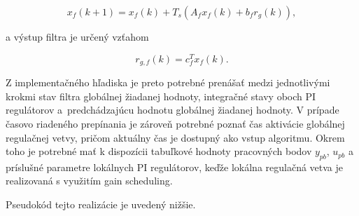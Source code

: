 \begin{equation}
x_f(k+1)=x_f(k)+T_s\left(A_f x_f(k)+b_f r_g(k)\right),
\label{eq:pi_switch_filter_discrete_state}
\end{equation}

a výstup filtra je určený vzťahom

\begin{equation}
r_{g,f}(k)=c_f^T x_f(k).
\label{eq:pi_switch_filter_discrete_output}
\end{equation}

Z implementačného hľadiska je preto potrebné
prenášať medzi jednotlivými krokmi
stav filtra globálnej žiadanej hodnoty,
integračné stavy oboch PI regulátorov
a~predchádzajúcu hodnotu globálnej žiadanej hodnoty.
V prípade časovo riadeného prepínania
je zároveň potrebné poznať čas aktivácie globálnej regulačnej vetvy,
pričom aktuálny čas je dostupný ako vstup algoritmu.
Okrem toho je potrebné mať k dispozícii tabuľkové hodnoty
pracovných bodov $y_{pb}$, $u_{pb}$
a príslušné parametre lokálnych PI regulátorov,
keďže lokálna regulačná vetva je realizovaná
s využitím gain scheduling.

Pseudokód tejto realizácie je uvedený nižšie.

